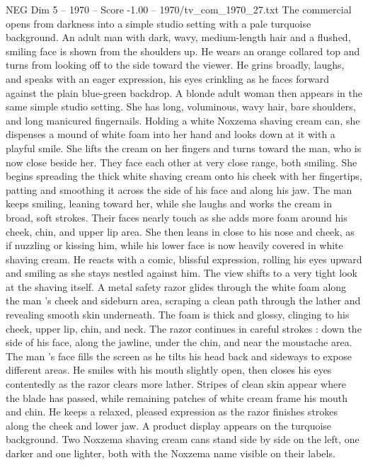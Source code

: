 \begin{textsample}{NEG Dim 5 – 1970 – Score -1.00 – 1970/tv\_com\_1970\_27.txt}  \label{ex:f5_neg_011}
The commercial opens from darkness into a simple studio setting with a pale turquoise background.
An adult man with dark, wavy, medium-length hair and a flushed, smiling face is shown from the shoulders up.
He wears an orange collared top and turns from looking off to the side toward the viewer.
He grins broadly, laughs, and speaks with an eager expression, his eyes crinkling as he faces forward against the plain blue-green backdrop.
A blonde adult woman then appears in the same simple studio setting.
She has long, voluminous, wavy hair, bare shoulders, and long manicured fingernails.
Holding a white Noxzema shaving cream can, she dispenses a mound of white foam into her hand and looks down at it with a playful smile.
She lifts the cream on her fingers and turns toward the man, who is now close beside her.
They face each other at very close range, both smiling.
She begins spreading the thick white shaving cream onto his cheek with her fingertips, patting and smoothing it across the side of his face and along his jaw.
The man keeps smiling, leaning toward her, while she laughs and works the cream in broad, soft strokes.
Their faces nearly touch as she adds more foam around his cheek, chin, and upper lip area.
She then leans in close to his nose and cheek, as if nuzzling or kissing him, while his lower face is now heavily covered in white shaving cream.
He reacts with a comic, blissful expression, rolling his eyes upward and smiling as she stays nestled against him.
The view shifts to a very tight look at the shaving itself.
A metal safety razor glides through the white foam along the man ’s cheek and sideburn area, scraping a clean path through the lather and revealing smooth skin underneath.
The foam is thick and glossy, clinging to his cheek, upper lip, chin, and neck.
The razor continues in careful strokes : down the side of his face, along the jawline, under the chin, and near the moustache area.
The man ’s face fills the screen as he tilts his head back and sideways to expose different areas.
He smiles with his mouth slightly open, then closes his eyes contentedly as the razor clears more lather.
Stripes of clean skin appear where the blade has passed, while remaining patches of white cream frame his mouth and chin.
He keeps a relaxed, pleased expression as the razor finishes strokes along the cheek and lower jaw.
A product display appears on the turquoise background.
Two Noxzema shaving cream cans stand side by side on the left, one darker and one lighter, both with the Noxzema name visible on their labels.

\end{textsample}
